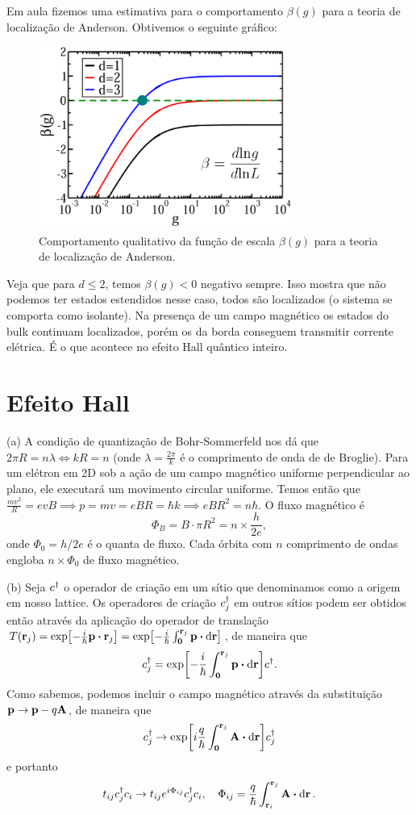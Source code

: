 \documentclass[a4paper,10pt]{article}
\begin{document}
Em aula fizemos uma estimativa para o comportamento $\beta(g)$ para a teoria de localização de Anderson. Obtivemos o seguinte gráfico:
\begin{figure}[H]
\centering
\includegraphics[width=0.75\textwidth]{fig/beta.png}
\caption{Comportamento qualitativo da função de escala $\beta(g)$ para a teoria de localização de Anderson.}
\label{fig:beta}
\end{figure}

Veja que para $d \leq 2$, temos $\beta(g) < 0$ negativo sempre. Isso mostra que não podemos ter estados estendidos nesse caso, todos são localizados (o sistema se comporta como isolante). Na presença de um campo magnético os estados do bulk continuam localizados, porém os da borda conseguem transmitir corrente elétrica. É o que acontece no efeito Hall quântico inteiro.

\pagebreak

\section{Efeito Hall}

(a) A condição de quantização de Bohr-Sommerfeld nos dá que $2\pi R = n \lambda \iff k R = n$ (onde $\lambda = \frac{2\pi}{k}$ é o comprimento de onda de de Broglie). Para um elétron em 2D sob a ação de um campo magnético uniforme perpendicular ao plano, ele executará um movimento circular uniforme. Temos então que $\frac{mv^2}{R} = e v B \implies p = mv = e B R = \hbar k \implies e B R^2 = n \hbar$. O fluxo magnético é
$$
\Phi_B = B \cdot \pi R^2 = n \times \frac{h}{2e},
$$
onde $\Phi_0 = h/2e$ é o quanta de fluxo. Cada órbita com $n$ comprimento de ondas engloba $n \times \Phi_0$ de fluxo magnético.

\n

(b) Seja $c^\dagger$ o operador de criação em um sítio que denominamos como a origem em nosso lattice. Os operadores de criação $c_j^\dagger$ em outros sítios podem ser obtidos então através da aplicação do operador de translação $T(\r_j) = \exp[-\frac{i}{\hbar} \p \vdot \r_j] = \exp[-\frac{i}{\hbar} \int_{\0}^{\r_j} \p \vdot \dd{\r}]$, de maneira que
$$
c_j^\d = \exp[-\frac{i}{\hbar} \int_{\0}^{\r_j} \p \vdot \dd{\r}] c^\d.
$$
Como sabemos, podemos incluir o campo magnético através da substituição $\vb{p} \to \vb{p} - q \vb{A}$, de maneira que
$$
c_j^\d \to \exp[i\frac{q}{\hbar} \int_{\0}^{\r_j} \A \vdot \dd{\r}] c_j^\d
$$
e portanto
$$
t_{ij} c_j^\d c_i \to t_{ij} e^{i \Phi_{ij}} c_j^\d c_i, \quad
\Phi_{ij} = \frac{q}{\hbar}\int_{\r_i}^{\r_j} \A \vdot \dd{\r}.
$$
\end{document}
